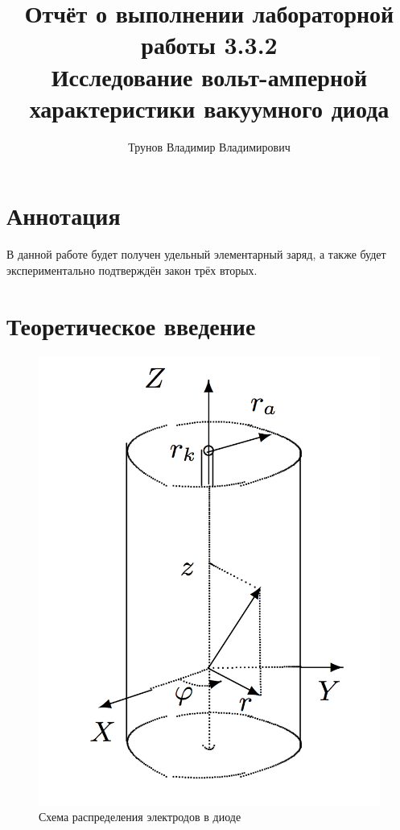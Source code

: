 \documentclass[a4paper, 12pt]{article}
\author{Трунов Владимир Владимирович}
\title{Отчёт о выполнении лабораторной работы 3.3.2 \\ Исследование вольт-амперной характеристики вакуумного диода}
\date{}
\begin{document}
\newpage
	\maketitle
    \newpage
	
	\section{Аннотация}
	В данной работе будет получен удельный элементарный заряд, а также будет экспериментально подтверждён закон трёх вторых.
	
	\section{Теоретическое введение}
	\begin{figure} 
		\includegraphics[scale=0.3]{diod}
		\caption{Схема распределения электродов в диоде}
	\end{figure}
	
\end{document}
